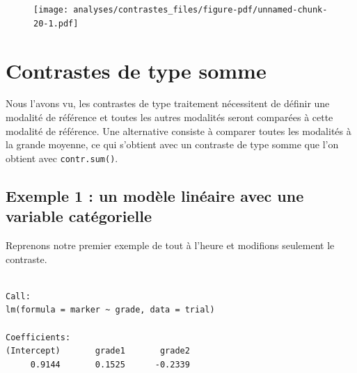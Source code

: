 \documentclass[
  letterpaper,
  DIV=11,
  numbers=noendperiod,
  oneside]{scrreprt}
\newenvironment{Shaded}{\begin{snugshade}}{\end{snugshade}}
\newcommand{\AttributeTok}[1]{\textcolor[rgb]{0.40,0.45,0.13}{#1}}
\newcommand{\FunctionTok}[1]{\textcolor[rgb]{0.28,0.35,0.67}{#1}}
\newcommand{\NormalTok}[1]{\textcolor[rgb]{0.00,0.23,0.31}{#1}}
\newcommand{\OtherTok}[1]{\textcolor[rgb]{0.00,0.23,0.31}{#1}}
\newcommand{\SpecialCharTok}[1]{\textcolor[rgb]{0.37,0.37,0.37}{#1}}
\begin{document}
\begin{figure}[H]

{\centering \texttt{[image: analyses/contrastes\_files/figure-pdf/unnamed-chunk-20-1.pdf]}

}

\end{figure}

\hypertarget{contrastes-de-type-somme}{%
\section{Contrastes de type somme}\label{contrastes-de-type-somme}}

Nous l'avons vu, les contrastes de type traitement nécessitent de
définir une modalité de référence et toutes les autres modalités seront
comparées à cette modalité de référence. Une alternative consiste à
comparer toutes les modalités à la grande moyenne, ce qui s'obtient avec
un contraste de type somme que l'on obtient avec \texttt{contr.sum()}.

\hypertarget{exemple-1-un-moduxe8le-linuxe9aire-avec-une-variable-catuxe9gorielle-1}{%
\subsection{Exemple 1 : un modèle linéaire avec une variable
catégorielle}\label{exemple-1-un-moduxe8le-linuxe9aire-avec-une-variable-catuxe9gorielle-1}}

Reprenons notre premier exemple de tout à l'heure et modifions seulement
le contraste.

\begin{Shaded}
\end{Shaded}

\begin{verbatim}

Call:
lm(formula = marker ~ grade, data = trial)

Coefficients:
(Intercept)       grade1       grade2  
     0.9144       0.1525      -0.2339  
\end{verbatim}
\end{document}
